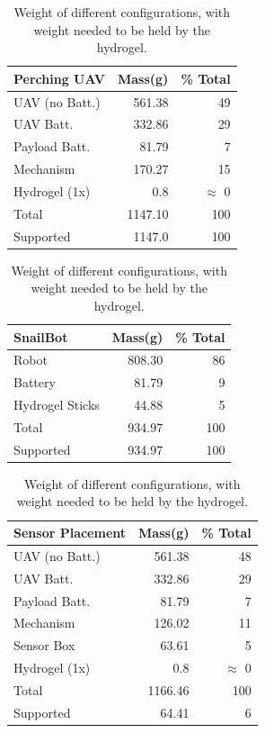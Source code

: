 \begin{table}
    \caption{Weight of different configurations, with weight needed to be held by the hydrogel.}
      \begin{tabular}[t]{lrr}
        Perching UAV  & Mass(g) & \% Total \\
        \hline
        UAV (no Batt.) & 561.38 & 49 \\ 
        UAV Batt. & 332.86 & 29 \\
        Payload Batt.  & 81.79 & 7\\
        Mechanism  & 170.27 & 15\\ 
        Hydrogel (1x)  & 0.8 & $\approx$ 0\\ 
        \hline
        Total & 1147.10 & 100\\
        Supported & 1147.0 & 100%
        \vspace{2em}
    \end{tabular}
    \begin{tabular}[t]{lrr}
        SnailBot  & Mass(g) & \% Total \\
        \hline
        Robot & 808.30 & 86\\
        Battery & 81.79 & 9\\
        Hydrogel Sticks  & 44.88 & 5\\ 
        \hline
        Total & 934.97 & 100   \\
        Supported & 934.97 & 100%
        \vspace{2em}
    \end{tabular}
    \begin{tabular}[t]{lrr}
        Sensor Placement  & Mass(g) & \% Total \\
        \hline
        UAV (no Batt.) & 561.38 & 48\\ 
        UAV Batt. & 332.86 & 29\\
        Payload Batt. & 81.79 & 7\\
        Mechanism  & 126.02 & 11\\ 
        Sensor Box  & 63.61 & 5\\
        Hydrogel (1x)  & 0.8 & $\approx$ 0\\ 
        \hline
        Total & 1166.46 & 100\\
        Supported & 64.41 & 6%
    \end{tabular}
    \label{tab:weight}
\end{table}

